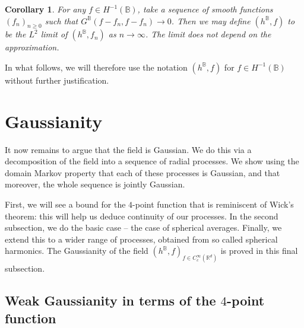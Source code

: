\documentclass[10pt]{amsart}
\newtheorem{cor}[theorem]{Corollary}
\theoremstyle{definition}
\newcommand{\R}{\mathbb{R}}
\newcommand{\B}{\mathbb{B}}\let\D\B\let\Ub\B
\begin{document}
\begin{cor}\label{cor}
For any $f\in H^{-1}(\B)$, take a sequence of smooth functions $(f_n)_{n\ge 0}$ such that $G^\B(f-f_n,f-f_n)\to 0$. Then we may define $(h^\B,f)$ to be the $L^2$ limit of $(h^\B,f_n)$ as $n\to \infty$. The limit does not depend on the approximation.
\end{cor}

In what follows, we will therefore use the notation $(h^\B, f)$ for $f\in H^{-1}(\B)$ without further justification.\enlargethispage{.5\baselineskip}%

\section{Gaussianity}\label{sec:gauss}

It now remains to argue that the field is Gaussian. We do this via a decomposition of the field into a sequence of radial processes. We show using the domain Markov property that each of these processes is Gaussian, and that moreover, the whole sequence is jointly Gaussian.

First, we will see a bound for the $4$-point function that is reminiscent of Wick's theorem: this will help us deduce continuity of our processes. In the second subsection, we do the basic case -- the case of spherical averages. Finally, we extend this to a wider range of processes, obtained from so called spherical harmonics. The Gaussianity of the field $(h^\B, f)_{f \in C_c^\infty(\R^d)}$ is proved in this final subsection.

\subsection{Weak Gaussianity in terms of the $4$-point function}
\end{document}
